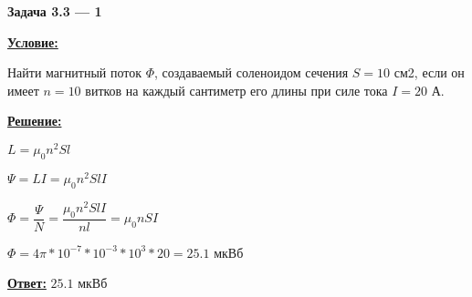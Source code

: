 
\begin{center}
    \textbf{Задача 3.3 --- 1}
\end{center}

\underline{\textbf{Условие:}}

Найти магнитный поток 
$ \Phi $, создаваемый соленоидом сечения 
$ S = 10 $ см2, 
если он имеет 
$ n = 10 $ витков на каждый сантиметр его 
длины при силе тока $ I = 20 $ А.

\underline{\textbf{Решение:}}

$ L = \mu_0 n^2 S l $

$ \Psi = LI = \mu_0 n^2 S l I $

$ \Phi = \dfrac{\Psi}{N} = 
\dfrac{\mu_0 n^2 S l I}{nl} =
\mu_0 n S I $

$ \Phi = 4\pi * 10^{-7} * 10^{-3} * 10^{3} * 20 = 25.1 $ мкВб

\underline{\textbf{Ответ:}}
$ 25.1 $ мкВб
